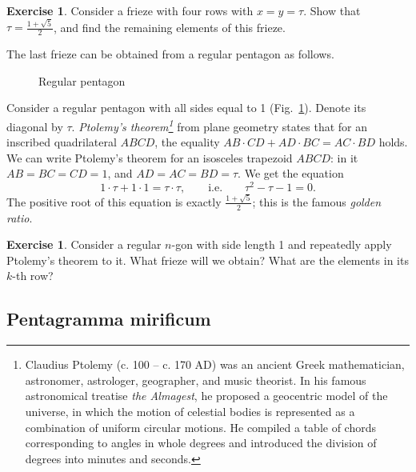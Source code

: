 \documentclass[a4paper,11pt]{amsart}
\theoremstyle{plain}
\theoremstyle{remark}
\theoremstyle{definition}
\newtheorem{exercise}[theorem]{Exercise}
\numberwithin{equation}{section}
\numberwithin{figure}{section}
\begin{document}
\begin{exercise}
Consider a frieze with four rows with $x=y=\tau$. Show that $\tau=\frac{1+\sqrt{5}}{2}$, and find the remaining elements of this frieze.
\end{exercise}

The last frieze can be obtained from a regular pentagon as follows.
\begin{figure}[h!]
\caption{Regular pentagon}\label{fig:pentagon}
\end{figure}
Consider a regular pentagon with all sides equal to 1 (Fig.~\ref{fig:pentagon}). Denote its diagonal by $\tau$. 
\emph{Ptolemy's theorem\footnote{Claudius Ptolemy (c. 100 -- c. 170 AD) was an ancient Greek mathematician, astronomer, astrologer, geographer, and music theorist. In his famous astronomical treatise \emph{the Almagest}, he proposed a geocentric model of the universe, in which the motion of celestial bodies is represented as a combination of uniform circular motions. He compiled a table of chords corresponding to angles in whole degrees and introduced the division of degrees into minutes and seconds.}} from plane geometry states that for an inscribed quadrilateral $ABCD$, the equality $AB\cdot CD+AD\cdot BC=AC\cdot BD$ holds. 
We can write Ptolemy's theorem for an isosceles trapezoid $ABCD$: in it $AB=BC=CD=1$, and $AD=AC=BD=\tau$. We get the equation
\[
1\cdot\tau + 1\cdot 1=\tau\cdot\tau,\qquad\text{i.e.}\qquad \tau^2-\tau-1=0.
\]
The positive root of this equation is exactly $\frac{1+\sqrt{5}}{2}$; this is the famous \emph{golden ratio}.

\begin{exercise}
Consider a regular $n$-gon with side length 1 and repeatedly apply Ptolemy's theorem to it. What frieze will we obtain? What are the elements in its $k$-th row?
\end{exercise}


\subsection{Pentagramma mirificum}
\end{document}
